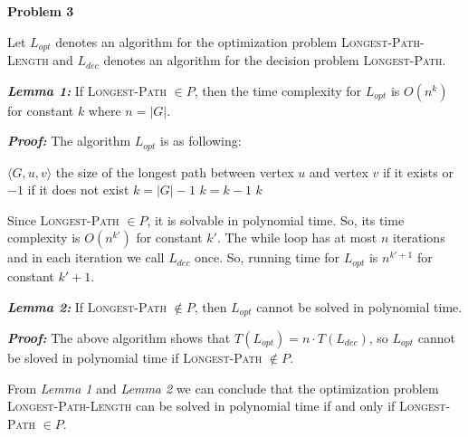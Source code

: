 \documentclass[12pt,letterpaper]{article}
\def\pp{\par\noindent}
\newcommand{\problem}[1]{ \bigskip \pp \textbf{Problem #1}\par}
\newcommand{\lemma}[1]{\pp\textbf{\textit{Lemma #1:}}}
\newcommand{\proof}{\pp\textbf{\textit{Proof: }}}
\begin{document}
\problem{3}
Let $L_{opt}$ denotes an algorithm for the optimization problem \textsc{Longest-Path-Length} and $L_{dec}$ denotes an algorithm for the decision problem \textsc{Longest-Path}.\par
\lemma{1} If \textsc{Longest-Path} $\in P$, then the time complexity for $L_{opt}$ is $O(n^k)$ for constant $k$ where $n=|G|$.
\proof The algorithm $L_{opt}$ is as following:
\begin{algorithm}
	\caption{$L_{opt}$}
\begin{algorithmic}[1]
	\REQUIRE $\langle G, u, v\rangle$
	\ENSURE the size of the longest path between vertex $u$ and vertex $v$ if it exists or $-1$ if it does not exist
	\STATE $k = |G| - 1$
	\STATE $k=k-1$
	\ENDWHILE
	\RETURN $k$
\end{algorithmic}
\end{algorithm}
Since \textsc{Longest-Path} $\in P$, it is solvable in polynomial time. So, its time complexity is $O(n^{k'})$ for constant $k'$. The while loop has at most $n$ iterations and in each iteration we call $L_{dec}$ once. So, running time for $L_{opt}$ is $n^{k'+1}$ for constant $k'+1$.
\lemma{2} If \textsc{Longest-Path} $\notin P$, then $L_{opt}$ cannot be solved in polynomial time.
\proof The above algorithm shows that $T(L_{opt})=n\cdot T(L_{dec})$, so $L_{opt}$ cannot be sloved in polynomial time if \textsc{Longest-Path} $\notin P$.\par
From \textit{Lemma 1} and \textit{Lemma 2} we can conclude that the optimization problem \textsc{Longest-Path-Length} can be solved in polynomial time if and only if \textsc{Longest-Path} $\in P$.
\end{document}
